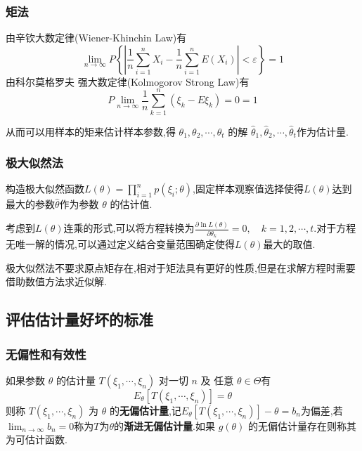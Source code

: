 \documentclass[10pt]{yerbaformat}
\begin{document}
\subsubsection{矩法}
\par 由辛钦大数定律(Wiener-Khinchin Law)有$$\lim _{n \rightarrow \infty} P\left\{\left|\frac{1}{n} \sum_{i=1}^{n} X_{i}-\frac{1}{n} \sum_{i=1}^{n} E\left(X_{i}\right)\right|<\varepsilon\right\}=1$$由科尔莫格罗夫 强大数定律(Kolmogorov Strong Law)有$$P \lim _{n \rightarrow \infty} \frac{1}{n} \sum_{k=1}^{n}\left(\xi_{k}-E \xi_{k}\right)=0=1$$
\par 从而可以用样本的矩来估计样本参数,得 $\theta_{1}, \theta_{2}, \cdots, \theta_{t}$ 的解 $\hat{\theta}_{1}, \hat{\theta}_{2}, \cdots, \hat{\theta}_{t}$作为估计量.

\subsubsection{极大似然法}
\par 构造极大似然函数$L(\theta)=\prod_{i=1}^{n} p\left(\xi_{i} ; \theta\right)$,固定样本观察值选择使得$L(\theta)$达到最大的参数$\hat{\theta}$作为参数 $\theta$ 的估计值.

\par 考虑到$L(\theta)$连乘的形式,可以将方程转换为$\frac{\partial \ln L(\theta)}{\partial \theta_{k}}=0, \quad k=1,2, \cdots, t$.对于方程无唯一解的情况,可以通过定义结合变量范围确定使得$L(\theta)$最大的取值.

\par 极大似然法不要求原点矩存在,相对于矩法具有更好的性质,但是在求解方程时需要借助数值方法求近似解.

\subsection{评估估计量好坏的标准}
\subsubsection{无偏性和有效性}

\begin{definition}[无偏估计量]
    如果参数 $\theta$ 的估计量 $T\left(\xi_{1}, \cdots, \xi_{n}\right)$ 对一切 $n$ 及 任意 $\theta \in \Theta$有$$E_{\theta}\left[T\left(\xi_{1}, \cdots, \xi_{n}\right)\right]=\theta$$
    则称 $T\left(\xi_{1}, \cdots, \xi_{n}\right)$ 为 $\theta$ 的\textbf{无偏估计量},记$E_{\theta}\left[T\left(\xi_{1}, \cdots, \xi_{n}\right)\right]-\theta=b_{n}$为偏差,若$\lim _{n \rightarrow \infty} b_{n}=0$称为$T$为$\theta$的\textbf{渐进无偏估计量}.如果 $g(\theta)$ 的无偏估计量存在则称其为可估计函数.
\end{definition}
\end{document}
